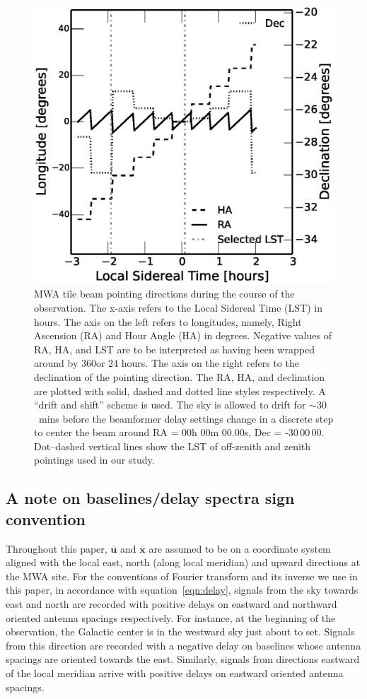 \documentclass[preprint2,iop,numberedappendix]{emulateapj}
\begin{document}
\begin{figure}[htb]
\centering
\includegraphics[width=\linewidth]{figures/v1_0/custom_pointings.eps}
\caption{MWA tile beam pointing directions during the course of the observation. The x-axis refers to the Local Sidereal Time (LST) in hours. The axis on the left refers to longitudes, namely, Right Ascension (RA) and Hour Angle (HA) in degrees. Negative values of RA, HA, and LST are to be interpreted as having been wrapped around by 360\arcdeg or 24 hours. The axis on the right refers to the declination of the pointing direction. The RA, HA, and declination are plotted with solid, dashed and dotted line styles respectively. A ``drift and shift'' scheme is used. The sky is allowed to drift for $\sim 30$~mins before the beamformer delay settings change in a discrete step to center the beam around RA = 00h 00m 00.00s, Dec = -30\arcdeg$\,$00\arcmin$\,$00. Dot--dashed vertical lines show the LST of off-zenith and zenith pointings used in our study. \label{fig:pointings}}
\end{figure}
\subsection*{A note on baselines/delay spectra sign convention}
Throughout this paper, $\overline{\mathbf{u}}$ and $\overline{\mathbf{x}}$ are assumed to be on a coordinate system aligned with the local east, north (along local meridian) and upward directions at the MWA site. For the conventions of Fourier transform and its inverse we use in this paper, in accordance with equation~\ref{eqn:delay}, signals from the sky towards east and north are recorded with positive delays on eastward and northward oriented antenna spacings respectively. For instance, at the beginning of the observation, the Galactic center is in the westward sky just about to set. Signals from this direction are recorded with a negative delay on baselines whose antenna spacings are oriented towards the east. Similarly, signals from directions eastward of the local meridian arrive with positive delays on eastward oriented antenna spacings. 
\end{document}
